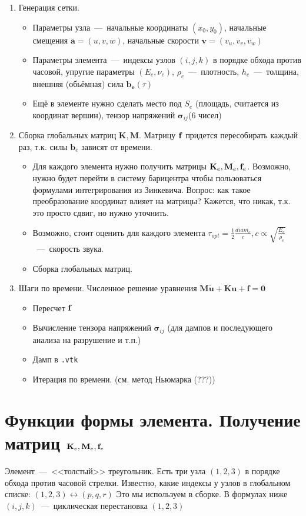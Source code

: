 \documentclass[12pt,a4paper,fleqn]{article}
\begin{document}
	\begin{enumerate}
		\item Генерация сетки.
			\begin{itemize}
				\item Параметры узла~---~начальные координаты $(x_0, y_0)$, начальные смещения $\mathbf{a} = (u, v, w)$,
							начальные скорости $\mathbf{v} = (v_u, v_v, v_w)$
				\item Параметры элемента~---~индексы узлов $(i, j, k)$ в порядке обхода против часовой, 
					упругие параметры $(E_e, \nu_e)$, $\rho_e$~---~плотность, $h_e$~---~толщина, внешняя (обьёмная) сила $\mathbf{b_e}(\tau)$
				\item Ещё в элементе нужно сделать место под $S_e$ (площадь, считается из координат вершин), 
						тензор напряжений $\mathbf{\sigma}_{ij}$(6 чисел)
			\end{itemize}
		\item Сборка глобальных матриц $\mathbf{K, M}$. Матрицу $\mathbf{f}$ придется пересобирать каждый раз, т.к. 
			силы $\mathbf{b}_e$ зависят от времени.
			\begin{itemize}
				\item Для каждого элемента нужно получить матрицы $\mathbf{K}_e, \mathbf{M}_e, \mathbf{f}_e$. Возможно, нужно будет перейти в систему барицентра чтобы пользоваться
					формулами интегрирования из Зинкевича. Вопрос: как такое преобразование координат влияет на матрицы? Кажется, что никак, т.к. это просто сдвиг, 
					но нужно уточнить.
				\item Возможно, стоит оценить для каждого элемента $\tau_{opt} = \frac12 \frac{diam_e}{c}, c \propto \sqrt{\frac{E_e}{\rho_e}}$~---~скорость звука.
				\item Сборка глобальных матриц.
			\end{itemize}
		\item Шаги по времени. Численное решение уравнения $\mathbf{M\ddot{u} + Ku + f} = \mathbf{0}$
			\begin{itemize}
				\item Пересчет $\mathbf{f}$
				\item Вычисление тензора напряжений $\mathbf{\sigma}_{ij}$ (для дампов и последующего анализа на разрушение и т.п.) 
				\item Дамп в \texttt{.vtk}
				\item Итерация по времени. (см. метод Ньюмарка (???))
			\end{itemize}
	\end{enumerate}
\section{Функции формы элемента. Получение матриц $\mathbf{K}_e, \mathbf{M}_e, \mathbf{f}_e$}
		Элемент~---~<<толстый>> треугольник. Есть три узла $(1, 2, 3)$ в порядке обхода против часовой стрелки. Известно, какие индексы у узлов в глобальном списке:
			$(1,2,3) \leftrightarrow (p, q, r)$ Это мы используем в сборке. В формулах ниже $(i, j, k)$~---~циклическая перестановка $(1,2,3)$
\end{document}
